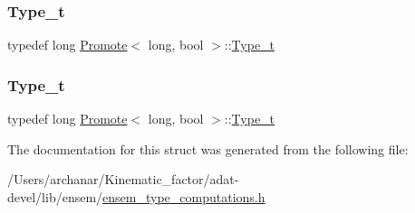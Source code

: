 \subsubsection{\texorpdfstring{Type\_t}{Type\_t}\hspace{0.1cm}{\footnotesize\ttfamily [2/3]}}
{\footnotesize\ttfamily typedef long \mbox{\hyperlink{structPromote}{Promote}}$<$ long, bool $>$\+::\mbox{\hyperlink{structPromote_3_01long_00_01bool_01_4_a925cd3195392464ce3df63fdd86c02bd}{Type\+\_\+t}}}

\mbox{\label{structPromote_3_01long_00_01bool_01_4_a925cd3195392464ce3df63fdd86c02bd}} 
\subsubsection{\texorpdfstring{Type\_t}{Type\_t}\hspace{0.1cm}{\footnotesize\ttfamily [3/3]}}
{\footnotesize\ttfamily typedef long \mbox{\hyperlink{structPromote}{Promote}}$<$ long, bool $>$\+::\mbox{\hyperlink{structPromote_3_01long_00_01bool_01_4_a925cd3195392464ce3df63fdd86c02bd}{Type\+\_\+t}}}



The documentation for this struct was generated from the following file\+:\begin{DoxyCompactItemize}
\item 
/\+Users/archanar/\+Kinematic\+\_\+factor/adat-\/devel/lib/ensem/\mbox{\hyperlink{adat-devel_2lib_2ensem_2ensem__type__computations_8h}{ensem\+\_\+type\+\_\+computations.\+h}}\end{DoxyCompactItemize}

